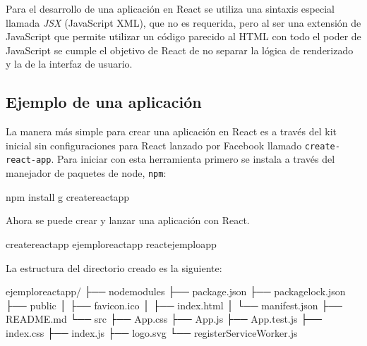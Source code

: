 Para el desarrollo de una aplicación en React se utiliza
una sintaxis especial llamada \textit{JSX} (JavaScript XML), que no
es requerida, pero al ser una extensión de JavaScript que permite
utilizar un código parecido al HTML con todo el poder de JavaScript
se cumple el objetivo de React de no separar la lógica de renderizado
y la de la interfaz de usuario.


\subsection*{Ejemplo de una aplicación}

La manera más simple para crear una aplicación en
React es a través del kit inicial sin
configuraciones para React lanzado por Facebook
llamado \texttt{create-react-app}.
Para iniciar con esta herramienta primero se instala a través del
manejador de paquetes de node, \texttt{npm}:

%
\begin{sphinxVerbatim}[commandchars=\\\{\}]
npm install \PYGZhy{}g create\PYGZhy{}react\PYGZhy{}app
\end{sphinxVerbatim}


Ahora se puede crear y lanzar una aplicación con React. 

%
\begin{sphinxVerbatim}[commandchars=\\\{\}]
create\PYGZhy{}react\PYGZhy{}app ejemplo\PYGZus{}react\PYGZus{}app
 react\PYGZus{}ejemplo\PYGZus{}app
\end{sphinxVerbatim}

La estructura del directorio creado es la siguiente:

%
\begin{sphinxVerbatim}[commandchars=\\\{\}]
ejemplo\PYGZus{}react\PYGZus{}app/
├── node\PYGZus{}modules
├── package.json
├── package\PYGZhy{}lock.json
├── public
│   ├── favicon.ico
│   ├── index.html
│   └── manifest.json
├── README.md
└── src
    ├── App.css
    ├── App.js
    ├── App.test.js
    ├── index.css
    ├── index.js
    ├── logo.svg
    └── registerServiceWorker.js
\end{sphinxVerbatim}

